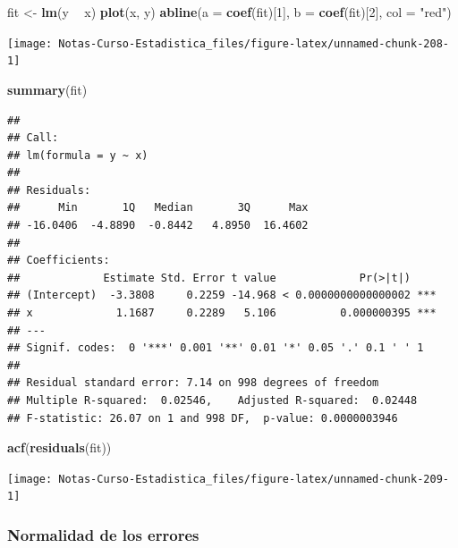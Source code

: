 \documentclass[
  12pt,
]{book}
\newenvironment{Shaded}{\begin{snugshade}}{\end{snugshade}}
\newcommand{\DataTypeTok}[1]{\textcolor[rgb]{0.13,0.29,0.53}{#1}}
\newcommand{\DecValTok}[1]{\textcolor[rgb]{0.00,0.00,0.81}{#1}}
\newcommand{\KeywordTok}[1]{\textcolor[rgb]{0.13,0.29,0.53}{\textbf{#1}}}
\newcommand{\NormalTok}[1]{#1}
\newcommand{\OperatorTok}[1]{\textcolor[rgb]{0.81,0.36,0.00}{\textbf{#1}}}
\newcommand{\StringTok}[1]{\textcolor[rgb]{0.31,0.60,0.02}{#1}}
\theoremstyle{definition}
\theoremstyle{definition}
\theoremstyle{definition}
\theoremstyle{remark}
\begin{document}
\begin{Shaded}
\begin{Highlighting}[]
\NormalTok{fit <-}\StringTok{ }\KeywordTok{lm}\NormalTok{(y }\OperatorTok{~}\StringTok{ }\NormalTok{x)}
\KeywordTok{plot}\NormalTok{(x, y)}
\KeywordTok{abline}\NormalTok{(}\DataTypeTok{a =} \KeywordTok{coef}\NormalTok{(fit)[}\DecValTok{1}\NormalTok{], }\DataTypeTok{b =} \KeywordTok{coef}\NormalTok{(fit)[}\DecValTok{2}\NormalTok{], }\DataTypeTok{col =} \StringTok{"red"}\NormalTok{)}
\end{Highlighting}
\end{Shaded}

\begin{center}\texttt{[image: Notas-Curso-Estadistica\_files/figure-latex/unnamed-chunk-208-1]} \end{center}

\begin{Shaded}
\begin{Highlighting}[]
\KeywordTok{summary}\NormalTok{(fit)}
\end{Highlighting}
\end{Shaded}

\begin{verbatim}
## 
## Call:
## lm(formula = y ~ x)
## 
## Residuals:
##      Min       1Q   Median       3Q      Max 
## -16.0406  -4.8890  -0.8442   4.8950  16.4602 
## 
## Coefficients:
##             Estimate Std. Error t value             Pr(>|t|)    
## (Intercept)  -3.3808     0.2259 -14.968 < 0.0000000000000002 ***
## x             1.1687     0.2289   5.106          0.000000395 ***
## ---
## Signif. codes:  0 '***' 0.001 '**' 0.01 '*' 0.05 '.' 0.1 ' ' 1
## 
## Residual standard error: 7.14 on 998 degrees of freedom
## Multiple R-squared:  0.02546,    Adjusted R-squared:  0.02448 
## F-statistic: 26.07 on 1 and 998 DF,  p-value: 0.0000003946
\end{verbatim}

\begin{Shaded}
\begin{Highlighting}[]
\KeywordTok{acf}\NormalTok{(}\KeywordTok{residuals}\NormalTok{(fit))}
\end{Highlighting}
\end{Shaded}

\begin{center}\texttt{[image: Notas-Curso-Estadistica\_files/figure-latex/unnamed-chunk-209-1]} \end{center}

\hypertarget{normalidad-de-los-errores}{%
\subsubsection{Normalidad de los errores}\label{normalidad-de-los-errores}}
\end{document}
